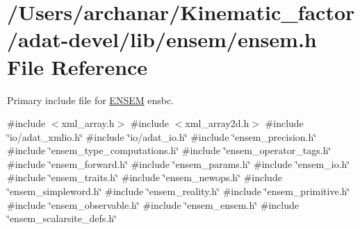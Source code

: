 \hypertarget{adat-devel_2lib_2ensem_2ensem_8h}{}\section{/\+Users/archanar/\+Kinematic\+\_\+factor/adat-\/devel/lib/ensem/ensem.h File Reference}
\label{adat-devel_2lib_2ensem_2ensem_8h}


Primary include file for \mbox{\hyperlink{namespaceENSEM}{E\+N\+S\+EM}} ensbc.  


{\ttfamily \#include $<$xml\+\_\+array.\+h$>$}\newline
{\ttfamily \#include $<$xml\+\_\+array2d.\+h$>$}\newline
{\ttfamily \#include \char`\"{}io/adat\+\_\+xmlio.\+h\char`\"{}}\newline
{\ttfamily \#include \char`\"{}io/adat\+\_\+io.\+h\char`\"{}}\newline
{\ttfamily \#include \char`\"{}ensem\+\_\+precision.\+h\char`\"{}}\newline
{\ttfamily \#include \char`\"{}ensem\+\_\+type\+\_\+computations.\+h\char`\"{}}\newline
{\ttfamily \#include \char`\"{}ensem\+\_\+operator\+\_\+tags.\+h\char`\"{}}\newline
{\ttfamily \#include \char`\"{}ensem\+\_\+forward.\+h\char`\"{}}\newline
{\ttfamily \#include \char`\"{}ensem\+\_\+params.\+h\char`\"{}}\newline
{\ttfamily \#include \char`\"{}ensem\+\_\+io.\+h\char`\"{}}\newline
{\ttfamily \#include \char`\"{}ensem\+\_\+traits.\+h\char`\"{}}\newline
{\ttfamily \#include \char`\"{}ensem\+\_\+newops.\+h\char`\"{}}\newline
{\ttfamily \#include \char`\"{}ensem\+\_\+simpleword.\+h\char`\"{}}\newline
{\ttfamily \#include \char`\"{}ensem\+\_\+reality.\+h\char`\"{}}\newline
{\ttfamily \#include \char`\"{}ensem\+\_\+primitive.\+h\char`\"{}}\newline
{\ttfamily \#include \char`\"{}ensem\+\_\+observable.\+h\char`\"{}}\newline
{\ttfamily \#include \char`\"{}ensem\+\_\+ensem.\+h\char`\"{}}\newline
{\ttfamily \#include \char`\"{}ensem\+\_\+scalarsite\+\_\+defs.\+h\char`\"{}}\newline
